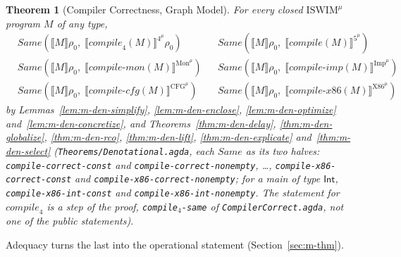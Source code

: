 \documentclass[10pt]{article}
\theoremstyle{acmplain}
\newtheorem{theorem}{Theorem}[section]
\newcommand{\SEM}[1]{\llbracket #1 \rrbracket}
\newcommand{\key}[1]{\mathsf{#1}}
\newcommand{\pass}[1]{\mathit{#1}}
\newcommand{\Same}{\mathit{Same}}
\newcommand{\Ml}[1]{\textrm{#1}^{\mu}}                  %
\begin{document}
\begin{theorem}[Compiler Correctness, Graph Model]\label{thm:m-den-compiler}\sloppy
For every closed $\Ml{ISWIM}$ program $M$ of any type,
\begin{align*}
  &\Same(\SEM{M}\rho_0,\; \SEM{\pass{compile}_4(M)}^{\Ml{4}}\rho_0) &
  &\Same(\SEM{M}\rho_0,\; \SEM{\pass{compile}(M)}^{\Ml{5}}) \\
  &\Same(\SEM{M}\rho_0,\; \SEM{\pass{compile\text{-}mon}(M)}^{\Ml{Mon}}) &
  &\Same(\SEM{M}\rho_0,\; \SEM{\pass{compile\text{-}imp}(M)}^{\Ml{Imp}}) \\
  &\Same(\SEM{M}\rho_0,\; \SEM{\pass{compile\text{-}cfg}(M)}^{\Ml{CFG}}) &
  &\Same(\SEM{M}\rho_0,\; \SEM{\pass{compile\text{-}x86}(M)}^{\Ml{X86}})
\end{align*}
by Lemmas~\ref{lem:m-den-simplify}, \ref{lem:m-den-enclose},
\ref{lem:m-den-optimize} and~\ref{lem:m-den-concretize}, and
Theorems~\ref{thm:m-den-delay}, \ref{thm:m-den-globalize},
\ref{thm:m-den-rco}, \ref{thm:m-den-lift}, \ref{thm:m-den-explicate}
and~\ref{thm:m-den-select} (\texttt{Theorems/\allowbreak Denotational.agda}, each
$\Same$ as its two halves: \texttt{compile-correct-const} and
\texttt{compile-correct-nonempty}, \ldots,
\texttt{compile-x86-correct-const} and
\texttt{compile-x86-correct-nonempty}; for a main of type $\key{Int}$,
\texttt{compile-x86-int-const} and \texttt{compile-x86-int-nonempty}.
The statement for $\pass{compile}_4$ is a step of the proof,
\texttt{compile$_4$-same} of \texttt{CompilerCorrect.agda}, not one of
the public statements).
\end{theorem}
Adequacy turns the last into the operational statement
(Section~\ref{sec:m-thm}).
\end{document}
